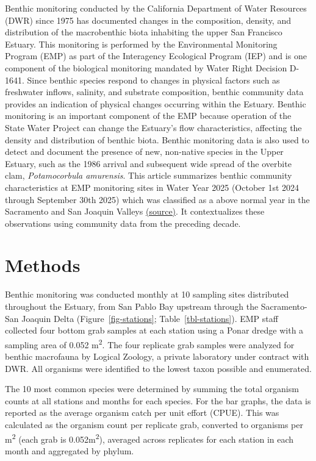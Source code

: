 \documentclass[
  letterpaper,
]{article}
\begin{document}
Benthic monitoring conducted by the California Department of Water
Resources (DWR) since 1975 has documented changes in the composition,
density, and distribution of the macrobenthic biota inhabiting the upper
San Francisco Estuary. This monitoring is performed by the Environmental
Monitoring Program (EMP) as part of the Interagency Ecological Program
(IEP) and is one component of the biological monitoring mandated by
Water Right Decision D-1641. Since benthic species respond to changes in
physical factors such as freshwater inflows, salinity, and substrate
composition, benthic community data provides an indication of physical
changes occurring within the Estuary. Benthic monitoring is an important
component of the EMP because operation of the State Water Project can
change the Estuary's flow characteristics, affecting the density and
distribution of benthic biota. Benthic monitoring data is also used to
detect and document the presence of new, non-native species in the Upper
Estuary, such as the 1986 arrival and subsequent wide spread of the
overbite clam, \emph{Potamocorbula amurensis}. This article summarizes
benthic community characteristics at EMP monitoring sites in Water Year
2025 (October 1st 2024 through September 30th 2025) which was classified
as a above normal year in the Sacramento and San Joaquin Valleys
\href{https://cdec.water.ca.gov/reportapp/javareports?name=WSIHIST}{(source)}.
It contextualizes these observations using community data from the
preceding decade.

\section{Methods}\label{methods}

Benthic monitoring was conducted monthly at 10 sampling sites
distributed throughout the Estuary, from San Pablo Bay upstream through
the Sacramento-San Joaquin Delta (Figure~\ref{fig-stations};
Table~\ref{tbl-stations}). EMP staff collected four bottom grab samples
at each station using a Ponar dredge with a sampling area of 0.052
m\textsuperscript{2}. The four replicate grab samples were analyzed for
benthic macrofauna by Logical Zoology, a private laboratory under
contract with DWR. All organisms were identified to the lowest taxon
possible and enumerated.

The 10 most common species were determined by summing the total organism
counts at all stations and months for each species. For the bar graphs,
the data is reported as the average organism catch per unit effort
(CPUE). This was calculated as the organism count per replicate grab,
converted to organisms per m\textsuperscript{2} (each grab is
0.052m\textsuperscript{2}), averaged across replicates for each station
in each month and aggregated by phylum.
\end{document}
